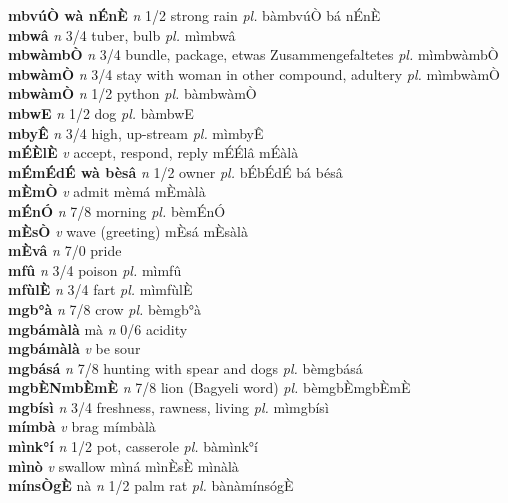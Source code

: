 \documentclass{article}
\begin{document}
{\bf mbvúÒ wà nÉnÈ}  {\it n} 1/2 strong rain {\it pl.} bàmbvúÒ bá nÉnÈ         \\ 
{\bf mbwâ}  {\it n} 3/4 tuber, bulb {\it pl.} mìmbwâ         \\ 
{\bf mbwàmbÒ}  {\it n} 3/4 bundle, package, etwas Zusammengefaltetes {\it pl.} mìmbwàmbÒ         \\ 
{\bf mbwàmÒ}  {\it n} 3/4 stay with woman in other compound, adultery {\it pl.} mìmbwàmÒ         \\ 
{\bf mbwàmÒ}  {\it n} 1/2 python {\it pl.} bàmbwàmÒ         \\ 
{\bf mbwE}  {\it n} 1/2 dog {\it pl.} bàmbwE         \\ 
{\bf mbyÊ}  {\it n} 3/4 high, up-stream {\it pl.} mìmbyÊ         \\ 
{\bf mÉÈlÈ}  {\it v} accept, respond, reply   mÉÉlâ   mÉàlà   \\ 
{\bf mÉmÉdÉ wà bèsâ}  {\it n} 1/2 owner {\it pl.} bÉbÉdÉ bá bésâ         \\ 
{\bf mÈmÒ}  {\it v} admit   mèmá   mÈmàlà   \\ 
{\bf mÉnÓ}  {\it n} 7/8 morning {\it pl.} bèmÉnÓ         \\ 
{\bf mÈsÒ}  {\it v} wave (greeting)   mÈsá   mÈsàlà   \\ 
{\bf mÈvâ}  {\it n} 7/0 pride         \\ 
{\bf mfû}  {\it n} 3/4 poison {\it pl.} mìmfû         \\ 
{\bf mfùlÈ}  {\it n} 3/4 fart {\it pl.} mìmfùlÈ         \\ 
{\bf mgb°à}  {\it n} 7/8 crow {\it pl.} bèmgb°à         \\ 
{\bf mgbámàlà} mà {\it n} 0/6 acidity         \\ 
{\bf mgbámàlà}  {\it v} be sour         \\ 
{\bf mgbásá}  {\it n} 7/8 hunting with spear and dogs {\it pl.} bèmgbásá         \\ 
{\bf mgbÈNmbÈmÈ}  {\it n} 7/8 lion (Bagyeli word) {\it pl.} bèmgbÈmgbÈmÈ         \\ 
{\bf mgbísì}  {\it n} 3/4 freshness, rawness, living {\it pl.} mìmgbísì         \\ 
{\bf mímbà}  {\it v} brag      mímbàlà   \\ 
{\bf mìnk°í}  {\it n} 1/2 pot, casserole {\it pl.} bàmìnk°í         \\ 
{\bf mìnò}  {\it v} swallow   mìná  mìnÈsÈ mìnàlà   \\ 
{\bf mínsÒgÈ} nà {\it n} 1/2 palm rat {\it pl.} bànàmínsógÈ         \\ 
\end{document}
